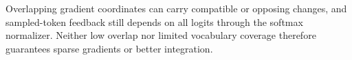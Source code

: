 Overlapping gradient coordinates can carry compatible or opposing
changes, and sampled-token feedback still depends on all logits through
the softmax normalizer. Neither low overlap nor limited vocabulary
coverage therefore guarantees sparse gradients or better integration.
